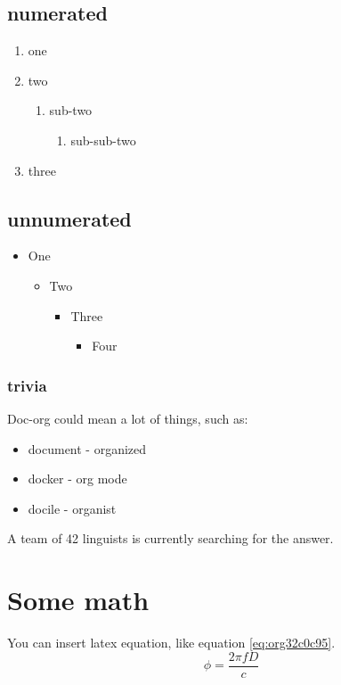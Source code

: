 \subsection{numerated}
\label{sec:orgd23afa2}
\begin{enumerate}
\item one
\item two
\begin{enumerate}
\item sub-two
\begin{enumerate}
\item sub-sub-two
\end{enumerate}
\end{enumerate}
\item three
\end{enumerate}

\subsection{unnumerated}
\label{sec:org847d414}
\begin{itemize}
\item One
\begin{itemize}
\item Two
\begin{itemize}
\item Three
\begin{itemize}
\item Four
\end{itemize}
\end{itemize}
\end{itemize}
\end{itemize}

\subsubsection{trivia}
\label{sec:orgd383622}
Doc-org could mean a lot of things, such as:
\begin{itemize}
\item document - organized
\item docker - org mode
\item docile - organist
\end{itemize}
A team of 42 linguists is currently searching for the answer.

\section{Some math}
\label{sec:org3dfdaf3}
You can insert latex equation, like equation \ref{eq:org32c0c95}.
\begin{equation}
\label{eq:org32c0c95}
\phi = \frac{2\pi fD}{c}
\end{equation}

